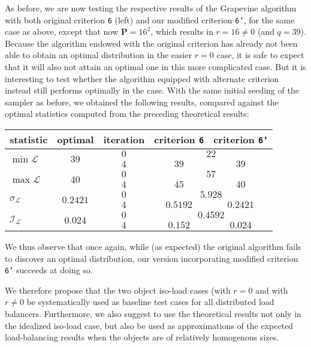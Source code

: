 As before, we are now testing the respective results of the
Grapevine algorithm with both original criterion \texttt{6} (left) and
our modified criterion \texttt{6'}, for the same case as above, except
that now $\mathbf{P}=16^2$, which results in $r=16\neq0$ (and $q=39$).
Because the algorithm endowed with the original criterion has already
not been able to obtain an optimal distribution in the easier $r=0$
case, it is safe to expect that it will also not attain an optimal one
in this more complicated case. But it is interesting to test whether
the algorithm equipped with alternate criterion instead still performs
optimally in the case.
With the same initial seeding of the sampler as before, we obtained
the following results, compared against the optimal statistics
computed from the preceding theoretical results:
\begin{center}
\begin{tabular}{lcccc}
\hline
statistic & optimal & iteration & criterion \texttt{6} & criterion \texttt{6'} \\
\hline\hline
\multirow{2}{*}{$\min{\mathcal{L}}$}
&\multirow{2}{*}{$39$}
&$0$ &\multicolumn{2}{c}{$22$} \\
&&$4$ &$39$    &$39$ \\\hline
\multirow{2}{*}{$\max{\mathcal{L}}$}
&\multirow{2}{*}{$40$}
&$0$ &\multicolumn{2}{c}{$57$} \\
&&$4$ &$45$   &$40$ \\\hline
\multirow{2}{*}{$\sigma_{\mathcal{L}}$}
&\multirow{2}{*}{$0.2421$}
&$0$ &\multicolumn{2}{c}{$5.928$} \\
&&$4$ &$0.5192$  &$0.2421$ \\\hline
\multirow{2}{*}{$\mathcal{I}_\mathcal{L}$}
&\multirow{2}{*}{$0.024$}
&$0$ &\multicolumn{2}{c}{$0.4592$} \\
&&$4$ &$0.152$  &$0.024$ \\\hline
\end{tabular}
\end{center}
We thus observe that once again, while (as expected) the original
algorithm fails to discover an optimal distribution, our version
incorporating modified criterion \texttt{6'} succeeds at doing so.

We therefore propose that the two object iso-load cases (with $r=0$
and with $r\neq0$ be systematically used as baseline test cases for
all distributed load balancers.
Furthermore, we also suggest to use the theoretical results not only
in the idealized iso-load case, but also be used as approximations of
the expected load-balancing results when the objects are of relatively
homogenous sizes.

